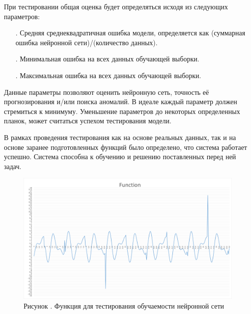 {	\par \redline При тестировании общая оценка будет определяться исходя из следующих параметров:
	
	\begin{itemize}[leftmargin=2.15cm, labelwidth=0.65cm, labelsep=0.0cm] 		
		\item[\theitemcntr. ]  Средняя среднеквадратичная ошибка модели, определяется как (суммарная ошибка нейронной сети)/(количество данных).
		\addtocounter{itemcntr}{1}
		
		\item[\theitemcntr. ] Минимальная ошибка на всех данных обучающей выборки.
		\addtocounter{itemcntr}{1}
		
		\item[\theitemcntr. ] Максимальная ошибка на всех данных обучающей выборки.
		\addtocounter{itemcntr}{1}
		
		\setcounter{itemcntr}{1}
	\end{itemize}  
	
	\par \redline Данные параметры позволяют оценить нейронную сеть, точность её прогнозирования и/или поиска аномалий. В идеале каждый параметр должен стремиться к минимуму. Уменьшение параметров до некоторых определенных планок, может считаться успехом тестирования модели.
	 
	\par \redline В рамках проведения тестирования как на основе реальных данных, так и на основе заранее подготовленных функций было определено, что система работает успешно. Система способна к обучению и решению поставленных перед ней задач.
	
	
	\par
	
	\begin{figure}
		\centering
		\def\svgwidth{\textwidth}
		\includegraphics[scale=0.5]{images/graphic2.png}
		\caption*{\gostFont Рисунок \thechaptercntr .\theimagecntr \spc {--} Функция для тестирования обучаемости нейронной сети}
		\label{fig:MLADBlackBox}
	\end{figure} \addtocounter{imagecntr}{1}
	
	
}


\setcounter{subchaptercntr}{1}
\setcounter{formulacntr}{1}
\setcounter{imagecntr}{1}
\setcounter{tablecntr}{1}

